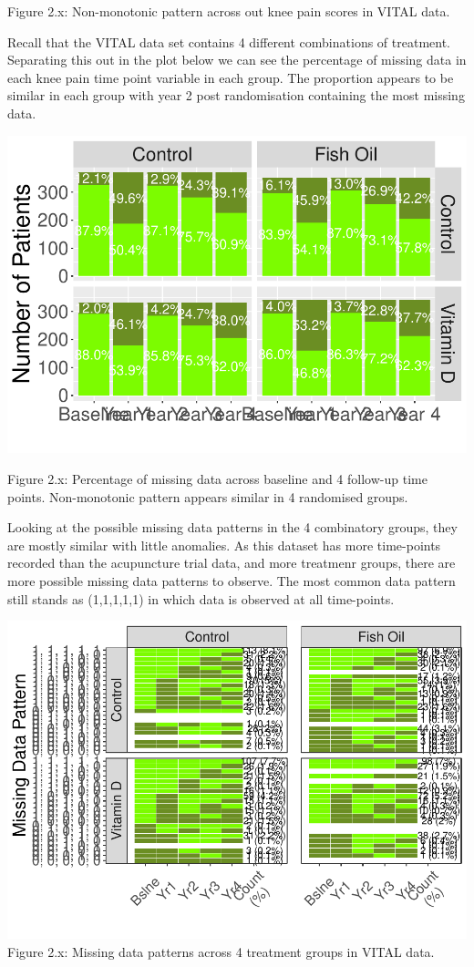 \documentclass{article}
\newcommand{\pandocbounded}[1]{#1}
\begin{document}
Figure 2.x: Non-monotonic pattern across out knee pain scores in VITAL
data.

Recall that the VITAL data set contains 4 different combinations of
treatment. Separating this out in the plot below we can see the
percentage of missing data in each knee pain time point variable in each
group. The proportion appears to be similar in each group with year 2
post randomisation containing the most missing data.

\pandocbounded{\includegraphics[keepaspectratio]{Final_Report_files/figure-latex/unnamed-chunk-12-1.pdf}}

Figure 2.x: Percentage of missing data across baseline and 4 follow-up
time points. Non-monotonic pattern appears similar in 4 randomised
groups.

Looking at the possible missing data patterns in the 4 combinatory
groups, they are mostly similar with little anomalies. As this dataset
has more time-points recorded than the acupuncture trial data, and more
treatmenr groups, there are more possible missing data patterns to
observe. The most common data pattern still stands as (1,1,1,1,1) in
which data is observed at all time-points.

\pandocbounded{\includegraphics[keepaspectratio]{Final_Report_files/figure-latex/unnamed-chunk-13-1.pdf}}
Figure 2.x: Missing data patterns across 4 treatment groups in VITAL
data.
\end{document}
